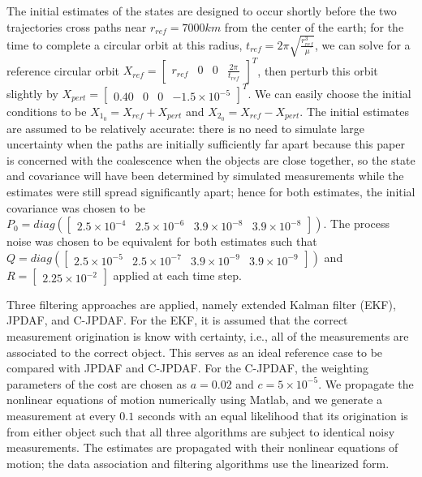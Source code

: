 \documentclass[letterpaper, 10pt, conference]{ieeeconf}
\newcommand{\EditTL}[1]{{\color{red}\protect #1}}
\begin{document}
The initial estimates of the states are designed to occur shortly before the two trajectories cross paths near $r_{ref}=7000km$ from the center of the earth; for the time to complete a circular orbit at this radius, $t_{ref}=2\pi \sqrt{\frac{r_{ref}^3}{\mu}}$, we can solve for a reference circular orbit $X_{ref}=\begin{bmatrix} r_{ref} & 0 & 0 & \frac{2\pi}{t_{ref}}\end{bmatrix}^T$, then perturb this orbit slightly by $X_{pert}=\begin{bmatrix} 0.40 & 0 & 0 & -1.5\times10^{-5}\end{bmatrix}^T$. We can easily choose the initial conditions to be $X_{1_0}= X_{ref}+X_{pert}$ and $X_{2_0}= X_{ref}-X_{pert}$. The initial estimates are assumed to be relatively accurate: there is no need to simulate large uncertainty when the paths are initially sufficiently far apart because this paper is concerned with the coalescence when the objects are close together, so the state and covariance will have been determined by simulated measurements while the estimates were still spread significantly apart; hence for both estimates, the initial covariance was chosen to be $P_0=diag(\begin{bmatrix}
2.5\times10^{-4} & 2.5\times10^{-6} & 3.9\times10^{-8} & 3.9\times10^{-8} \end{bmatrix})$.
The process noise was chosen to be equivalent for both estimates such that $Q=diag(\begin{bmatrix}
2.5\times10^{-5} & 2.5\times10^{-7} & 3.9\times10^{-9}& 3.9\times10^{-9}\end{bmatrix})$ and $R=\begin{bmatrix}
2.25\times10^{-2}
\end{bmatrix}$ applied at each time step.



Three filtering approaches are applied, namely extended Kalman filter (EKF), JPDAF, and C-JPDAF. For the EKF, it is assumed that the correct measurement origination is know with certainty, i.e., all of the measurements are associated to the correct object. This serves as an ideal reference case to be compared with JPDAF and C-JPDAF. For the C-JPDAF, the weighting parameters of the cost are chosen as $a=0.02$ and $c=5\times10^{-5}$. We propagate the nonlinear equations of motion numerically using Matlab, and we generate a measurement at every $0.1$ seconds with an equal likelihood that its origination is from either object such that all three algorithms are subject to identical noisy measurements. The estimates are propagated with their nonlinear equations of motion; the data association and filtering algorithms use the linearized form.
\end{document}
